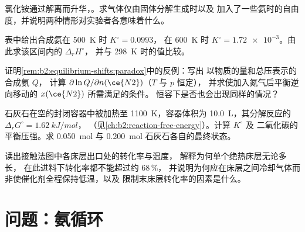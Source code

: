 \begin{exercise}[$\star\star$]\label{exo:b2:equilibrium-shifts:8}
氯化铵通过解离而升华，。求气体仅由固体分解生成时以及
加入了一些氨时的自由度，并说明两种情形对实验者各意味着什么。
\end{exercise}

\begin{exercise}[$\star\star$]\label{exo:b2:equilibrium-shifts:9}
表中给出合成氨在 \qty{500}{K} 时 $K^\circ = 0.0993$，
在 \qty{600}{K} 时 $K^\circ = \num{1.72e-3}$。由此求该区间内的 $\Delta_r H^\circ$，
并与 \qty{298}{K} 时的值比较。
\end{exercise}

\begin{exercise}[$\star\star\star$]\label{exo:b2:equilibrium-shifts:10}
证明\cref{rem:b2:equilibrium-shifts:paradox}中的反例：写出
以物质的量和总压表示的合成氨 $Q$，
计算 $\partial\ln Q/\partial n(\ce{N2})$（$T$ 与 $p$ 恒定），
并求使加入氮气后平衡逆向移动的 $x(\ce{N2})$ 所需满足的条件。
恒容下是否也会出现同样的情况？
\end{exercise}

\begin{exercise}[$\star\star\star$]\label{exo:b2:equilibrium-shifts:11}
石灰石在空的封闭容器中被加热至 \qty{1100}{K}，容器体积为
\qty{10.0}{L}，其分解反应的 $\Delta_r G^\circ = \qty{1.62}{kJ/mol}$，
（见\cref{ch:b2:reaction-free-energy}）。计算 $K^\circ$ 及
二氧化碳的平衡压强。求
\qty{0.050}{mol} 与 \qty{0.200}{mol} 石灰石各自的最终状态。
\end{exercise}

\begin{exercise}[$\star\star\star$]\label{exo:b2:equilibrium-shifts:12}
读出接触法图中各床层出口处的转化率与温度，
解释为何单个绝热床层无论多长，
在此进料下转化率都不能超过约 68\,\%，
并说明为何应在床层之间冷却气体而非使催化剂全程保持低温，以及
限制末床层转化率的因素是什么。
\end{exercise}

\section{问题：氨循环}

